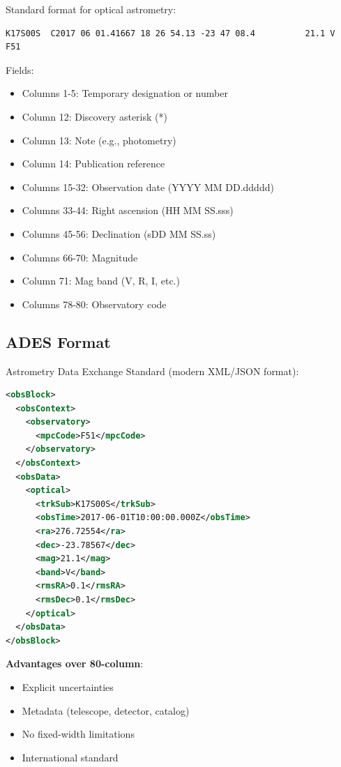 Standard format for optical astrometry:

\begin{lstlisting}[basicstyle=\ttfamily\tiny, frame=none, xleftmargin=0pt]
     K17S00S  C2017 06 01.41667 18 26 54.13 -23 47 08.4          21.1 V      F51
\end{lstlisting}

Fields:
\begin{itemize}
    \item Columns 1-5: Temporary designation or number
    \item Column 12: Discovery asterisk (*)
    \item Column 13: Note (e.g., photometry)
    \item Column 14: Publication reference
    \item Columns 15-32: Observation date (YYYY MM DD.ddddd)
    \item Columns 33-44: Right ascension (HH MM SS.sss)
    \item Columns 45-56: Declination (sDD MM SS.ss)
    \item Columns 66-70: Magnitude
    \item Column 71: Mag band (V, R, I, etc.)
    \item Columns 78-80: Observatory code
\end{itemize}

\subsection{ADES Format}

Astrometry Data Exchange Standard (modern XML/JSON format):

\begin{lstlisting}[language=XML,caption={ADES XML example}]
<obsBlock>
  <obsContext>
    <observatory>
      <mpcCode>F51</mpcCode>
    </observatory>
  </obsContext>
  <obsData>
    <optical>
      <trkSub>K17S00S</trkSub>
      <obsTime>2017-06-01T10:00:00.000Z</obsTime>
      <ra>276.72554</ra>
      <dec>-23.78567</dec>
      <mag>21.1</mag>
      <band>V</band>
      <rmsRA>0.1</rmsRA>
      <rmsDec>0.1</rmsDec>
    </optical>
  </obsData>
</obsBlock>
\end{lstlisting}

\textbf{Advantages over 80-column}:
\begin{itemize}
    \item Explicit uncertainties
    \item Metadata (telescope, detector, catalog)
    \item No fixed-width limitations
    \item International standard
\end{itemize}

